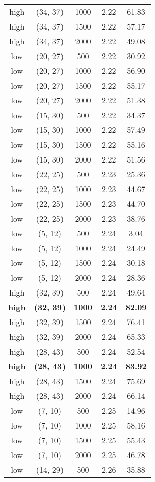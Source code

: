 \begin{tabular}{c c c c c}
high & (34, 37) &  1000 & 2.22 & 61.83 \\
high & (34, 37) &  1500 & 2.22 & 57.17 \\
high & (34, 37) &  2000 & 2.22 & 49.08 \\
low & (20, 27) &  500 & 2.22 & 30.92 \\
low & (20, 27) &  1000 & 2.22 & 56.90 \\
low & (20, 27) &  1500 & 2.22 & 55.17 \\
low & (20, 27) &  2000 & 2.22 & 51.38 \\
low & (15, 30) &  500 & 2.22 & 34.37 \\
low & (15, 30) &  1000 & 2.22 & 57.49 \\
low & (15, 30) &  1500 & 2.22 & 55.16 \\
low & (15, 30) &  2000 & 2.22 & 51.56 \\
low & (22, 25) &  500 & 2.23 & 25.36 \\
low & (22, 25) &  1000 & 2.23 & 44.67 \\
low & (22, 25) &  1500 & 2.23 & 44.70 \\
low & (22, 25) &  2000 & 2.23 & 38.76 \\
low & (5, 12) &  500 & 2.24 & 3.04 \\
low & (5, 12) &  1000 & 2.24 & 24.49 \\
low & (5, 12) &  1500 & 2.24 & 30.18 \\
low & (5, 12) &  2000 & 2.24 & 28.36 \\
high & (32, 39) &  500 & 2.24 & 49.64 \\
\textbf{high} & \textbf{(32, 39)} & \textbf{ 1000} & \textbf{2.24} & \textbf{82.09} \\
high & (32, 39) &  1500 & 2.24 & 76.41 \\
high & (32, 39) &  2000 & 2.24 & 65.33 \\
high & (28, 43) &  500 & 2.24 & 52.54 \\
\textbf{high} & \textbf{(28, 43)} & \textbf{ 1000} & \textbf{2.24} & \textbf{83.92} \\
high & (28, 43) &  1500 & 2.24 & 75.69 \\
high & (28, 43) &  2000 & 2.24 & 66.14 \\
low & (7, 10) &  500 & 2.25 & 14.96 \\
low & (7, 10) &  1000 & 2.25 & 58.16 \\
low & (7, 10) &  1500 & 2.25 & 55.43 \\
low & (7, 10) &  2000 & 2.25 & 46.78 \\
low & (14, 29) &  500 & 2.26 & 35.88 \\

\end{tabular}
